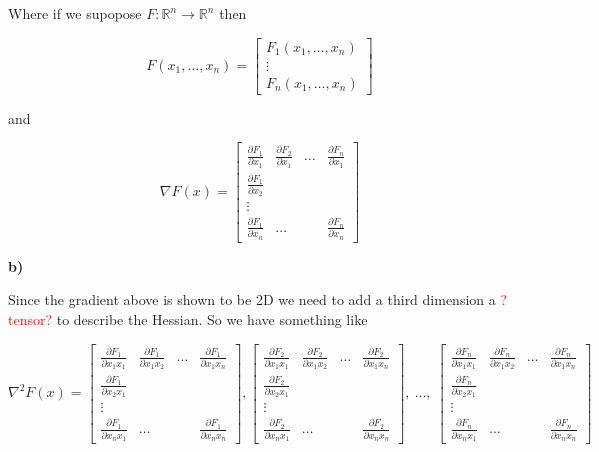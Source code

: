 Where if we supopose $F: \mathbb{R}^n \rightarrow \mathbb{R}^n$ then

\[
F(x_1, \ldots, x_n) =
\begin{bmatrix}
	F_1(x_1, \ldots, x_n) \\
	\vdots \\
	F_n(x_1, \ldots, x_n)
\end{bmatrix}
\]

and

\[
\nabla F(x) =
\begin{bmatrix}
	\frac{\partial F_1}{\partial x_1} & \frac{\partial F_2}{\partial x_1} & \ldots & \frac{\partial F_n}{\partial x_1} \\
	\frac{\partial F_1}{\partial x_2} & \\
	\vdots \\
	\frac{\partial F_1}{\partial x_n} & \ldots & & \frac{\partial F_n}{\partial x_n}
\end{bmatrix}
\]


\textbf{b)}

Since the gradient above is shown to be 2D we need to add a third dimension a \textcolor{red}{?tensor?} to describe the Hessian. So we have something like

\[
\nabla^2 F(x) =
\begin{bmatrix}
\frac{\partial F_1}{\partial x_1 x_1} & \frac{\partial F_1}{\partial x_1 x_2} & \ldots & \frac{\partial F_1}{\partial x_1 x_n} \\
\frac{\partial F_1}{\partial x_2 x_1} & \\
\vdots \\
\frac{\partial F_1}{\partial x_n x_1} & \ldots & & \frac{\partial F_1}{\partial x_n x_n}
\end{bmatrix},
\begin{bmatrix}
\frac{\partial F_2}{\partial x_1 x_1} & \frac{\partial F_2}{\partial x_1 x_2} & \ldots & \frac{\partial F_2}{\partial x_1 x_n} \\
\frac{\partial F_2}{\partial x_2 x_1} & \\
\vdots \\
\frac{\partial F_2}{\partial x_n x_1} & \ldots & & \frac{\partial F_2}{\partial x_n x_n}
\end{bmatrix},\ \ldots,\
\begin{bmatrix}
\frac{\partial F_n}{\partial x_1 x_1} & \frac{\partial F_n}{\partial x_1 x_2} & \ldots & \frac{\partial F_n}{\partial x_1 x_n} \\
\frac{\partial F_n}{\partial x_2 x_1} & \\
\vdots \\
\frac{\partial F_n}{\partial x_n x_1} & \ldots & & \frac{\partial F_n}{\partial x_n x_n}
\end{bmatrix}
\]

